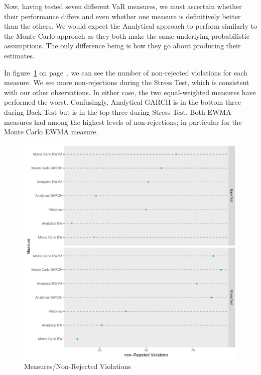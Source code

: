 \documentclass[../Dissertation.tex]{subfiles}
\begin{document}
Now, having tested seven different VaR measures, we must ascertain whether their performance differs and even whether one measure is definitively better than the others.
We would expect the Analytical approach to perform similarly to the Monte Carlo approach as they both make the same underlying probabilistic assumptions.
The only difference being is how they go about producing their estimates.

In figure~\ref{fig:nonrejectionviolations} on page~\pageref{fig:nonrejectionviolations}, we can see the number of non-rejected violations for each measure.
We see more non-rejections during the Stress Test, which is consistent with our other observations.
In either case, the two equal-weighted measures have performed the worst.
Confusingly, Analytical GARCH is in the bottom three during Back Test but is in the top three during Stress Test.
Both EWMA measures had among the highest levels of non-rejections; in particular for the Monte Carlo EWMA measure.

\begin{figure}
\caption{Measures/Non-Rejected Violations}
\label{fig:nonrejectionviolations}
\centering
\includegraphics[width=\textwidth]{./assets/nonrejectionviolations.pdf}
\end{figure}
\end{document}
